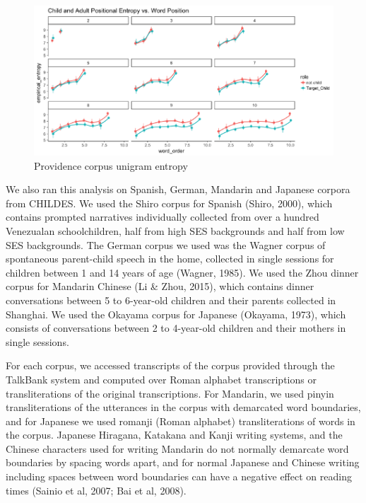 \documentclass[10pt, letterpaper]{article}
\newenvironment{CodeChunk}{}{}
\begin{document}
\begin{CodeChunk}
\begin{figure}[h]

{\centering \includegraphics{figs/providence_PE-1} 

}

\caption[Providence corpus unigram entropy]{Providence corpus unigram entropy}\label{fig:providence_PE}
\end{figure}
\end{CodeChunk}

We also ran this analysis on Spanish, German, Mandarin and Japanese
corpora from CHILDES. We used the Shiro corpus for Spanish (Shiro,
2000), which contains prompted narratives individually collected from
over a hundred Venezualan schoolchildren, half from high SES backgrounds
and half from low SES backgrounds. The German corpus we used was the
Wagner corpus of spontaneous parent-child speech in the home, collected
in single sessions for children between 1 and 14 years of age (Wagner,
1985). We used the Zhou dinner corpus for Mandarin Chinese (Li \& Zhou,
2015), which contains dinner conversations between 5 to 6-year-old
children and their parents collected in Shanghai. We used the Okayama
corpus for Japanese (Okayama, 1973), which consists of conversations
between 2 to 4-year-old children and their mothers in single sessions.

For each corpus, we accessed transcripts of the corpus provided through
the TalkBank system and computed over Roman alphabet transcriptions or
transliterations of the original transcriptions. For Mandarin, we used
pinyin transliterations of the utterances in the corpus with demarcated
word boundaries, and for Japanese we used romanji (Roman alphabet)
transliterations of words in the corpus. Japanese Hiragana, Katakana and
Kanji writing systems, and the Chinese characters used for writing
Mandarin do not normally demarcate word boundaries by spacing words
apart, and for normal Japanese and Chinese writing including spaces
between word boundaries can have a negative effect on reading times
(Sainio et al, 2007; Bai et al, 2008).
\end{document}
